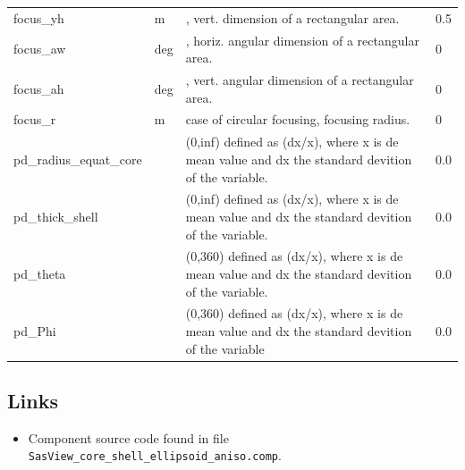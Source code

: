 \begin{longtable}{p{}p{}p{}p{}}
focus\_yh & m & , vert. dimension of a rectangular area. & 0.5 \\
focus\_aw & deg & , horiz. angular dimension of a rectangular area. & 0 \\
focus\_ah & deg & , vert. angular dimension of a rectangular area. & 0 \\
focus\_r & m & case of circular focusing, focusing radius. & 0 \\
pd\_radius\_equat\_core &  & (0,inf) defined as (dx/x), where x is de mean value and dx the standard devition of the variable. & 0.0 \\
pd\_thick\_shell &  & (0,inf) defined as (dx/x), where x is de mean value and dx the standard devition of the variable. & 0.0 \\
pd\_theta &  & (0,360) defined as (dx/x), where x is de mean value and dx the standard devition of the variable. & 0.0 \\
pd\_Phi &  & (0,360) defined as (dx/x), where x is de mean value and dx the standard devition of the variable & 0.0 \\
\bottomrule
\end{longtable}

\subsection*{Links}
\begin{itemize}
  \item Component source code found in file \texttt{SasView\_core\_shell\_ellipsoid\_aniso.comp}.
\end{itemize}
